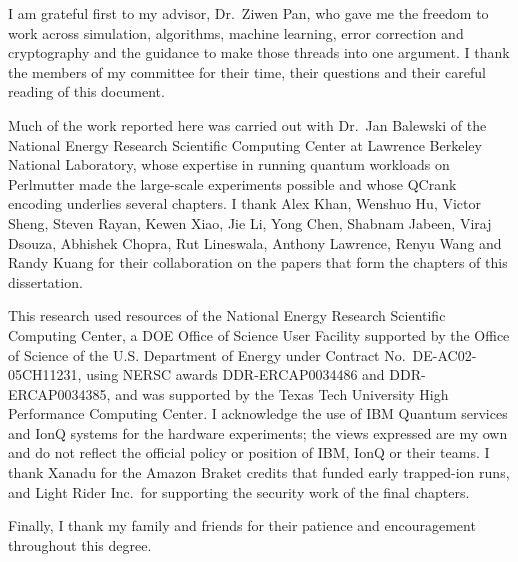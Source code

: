 \begin{acknowledgments}
I am grateful first to my advisor, Dr.~Ziwen Pan, who gave me the freedom to work across simulation, algorithms, machine learning, error correction and cryptography and the guidance to make those threads into one argument. I thank the members of my committee for their time, their questions and their careful reading of this document.

Much of the work reported here was carried out with Dr.~Jan Balewski of the National Energy Research Scientific Computing Center at Lawrence Berkeley National Laboratory, whose expertise in running quantum workloads on Perlmutter made the large-scale experiments possible and whose QCrank encoding underlies several chapters. I thank Alex Khan, Wenshuo Hu, Victor Sheng, Steven Rayan, Kewen Xiao, Jie Li, Yong Chen, Shabnam Jabeen, Viraj Dsouza, Abhishek Chopra, Rut Lineswala, Anthony Lawrence, Renyu Wang and Randy Kuang for their collaboration on the papers that form the chapters of this dissertation.

This research used resources of the National Energy Research Scientific Computing Center, a DOE Office of Science User Facility supported by the Office of Science of the U.S. Department of Energy under Contract No.~DE-AC02-05CH11231, using NERSC awards DDR-ERCAP0034486 and DDR-ERCAP0034385, and was supported by the Texas Tech University High Performance Computing Center. I acknowledge the use of IBM Quantum services and IonQ systems for the hardware experiments; the views expressed are my own and do not reflect the official policy or position of IBM, IonQ or their teams. I thank Xanadu for the Amazon Braket credits that funded early trapped-ion runs, and Light Rider Inc.\ for supporting the security work of the final chapters.

Finally, I thank my family and friends for their patience and encouragement throughout this degree.
\end{acknowledgments}
